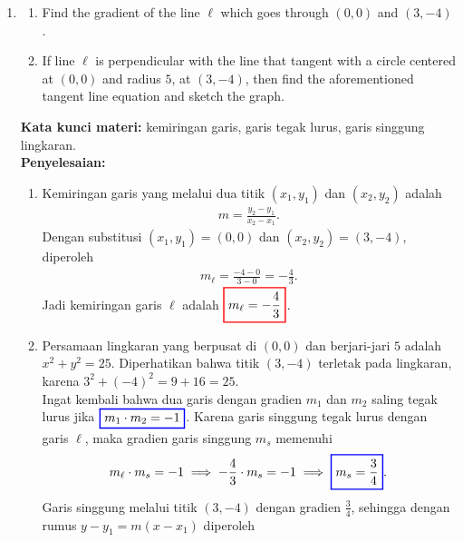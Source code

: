 \documentclass[10pt,openany,a4paper]{article}
\theoremstyle{definition}
\theoremstyle{definition}
\theoremstyle{plain}
\newenvironment{jawab}[2][tes]{%
\par\noindent\textbf{Kata kunci materi:} #1.\\
\textbf{Penyelesaian:} #2%
}{}
\begin{document}
\begin{enumerate}
    \item \begin{enumerate}
        \item Find the gradient of the line $\ell$ which goes through $(0,0)$ and $(3,-4)$.
        \item If line $\ell$ is perpendicular with the line that tangent with a circle centered at $(0,0)$ and radius $5$, at $(3,-4)$, then find the aforementioned tangent line equation and sketch the graph.
    \end{enumerate}
    \begin{jawab}[kemiringan garis, garis tegak lurus, garis singgung lingkaran]{
        \begin{enumerate}
            \item Kemiringan garis yang melalui dua titik $(x_1,y_1)$ dan $(x_2,y_2)$ adalah
            \begin{align*}
                m = \frac{y_2 - y_1}{x_2 - x_1}.
            \end{align*}
            Dengan substitusi $(x_1,y_1)=(0,0)$ dan $(x_2,y_2)=(3,-4)$, diperoleh
            \begin{align*}
                m_\ell = \frac{-4 - 0}{3 - 0} = -\frac{4}{3}.
            \end{align*}
            Jadi kemiringan garis $\ell$ adalah $\colorlet{oldcolor}{.}
        \color{red}
        \setlength{\fboxrule}{1pt} \boxed{\color{oldcolor}m_\ell = -\frac{4}{3}}\color{oldcolor}$.
            \item Persamaan lingkaran yang berpusat di $(0,0)$ dan berjari-jari $5$ adalah $x^2 + y^2 = 25$. Diperhatikan bahwa titik $(3,-4)$ terletak pada lingkaran, karena $3^2 + (-4)^2 = 9 + 16 = 25$. \\
            Ingat kembali bahwa dua garis dengan gradien $m_1$ dan $m_2$ saling tegak lurus jika $\colorlet{oldcolor}{.}
        \color{blue}
        \setlength{\fboxrule}{1pt} \boxed{\color{oldcolor}m_1\cdot m_2=-1}\color{oldcolor}$. Karena garis singgung tegak lurus dengan garis $\ell$, maka gradien garis singgung $m_s$ memenuhi
            \begin{align*}
                m_\ell \cdot m_s = -1 \implies -\frac{4}{3}\cdot m_s = -1 \implies \colorlet{oldcolor}{.}
        \color{blue}
        \setlength{\fboxrule}{1pt} \boxed{\color{oldcolor}m_s = \frac{3}{4}}\color{oldcolor}.
            \end{align*}
            Garis singgung melalui titik $(3,-4)$ dengan gradien $\frac{3}{4}$, sehingga dengan rumus $y - y_1 = m(x - x_1)$ diperoleh

\end{enumerate}}
\end{jawab}
\end{enumerate}
\end{document}
